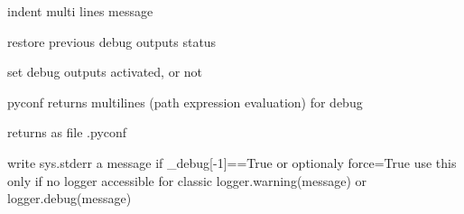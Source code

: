 \documentclass[a4paper,10pt,english]{sphinxmanual}
\begin{document}

\begin{fulllineitems}
\label{commands/apidoc/src:src.debug.indent}
indent multi lines message

\end{fulllineitems}


\begin{fulllineitems}
\label{commands/apidoc/src:src.debug.pop_debug}
restore previous debug outputs status

\end{fulllineitems}


\begin{fulllineitems}
\label{commands/apidoc/src:src.debug.push_debug}
set debug outputs activated, or not

\end{fulllineitems}


\begin{fulllineitems}
\label{commands/apidoc/src:src.debug.saveConfigDbg}
pyconf returns multilines (path expression evaluation) for debug

\end{fulllineitems}


\begin{fulllineitems}
\label{commands/apidoc/src:src.debug.saveConfigStd}
returns as file .pyconf

\end{fulllineitems}


\begin{fulllineitems}
\label{commands/apidoc/src:src.debug.tofix}
write sys.stderr a message if \_debug{[}-1{]}==True or optionaly force=True
use this only if no logger accessible for classic 
logger.warning(message) or logger.debug(message)

\end{fulllineitems}
\end{document}
